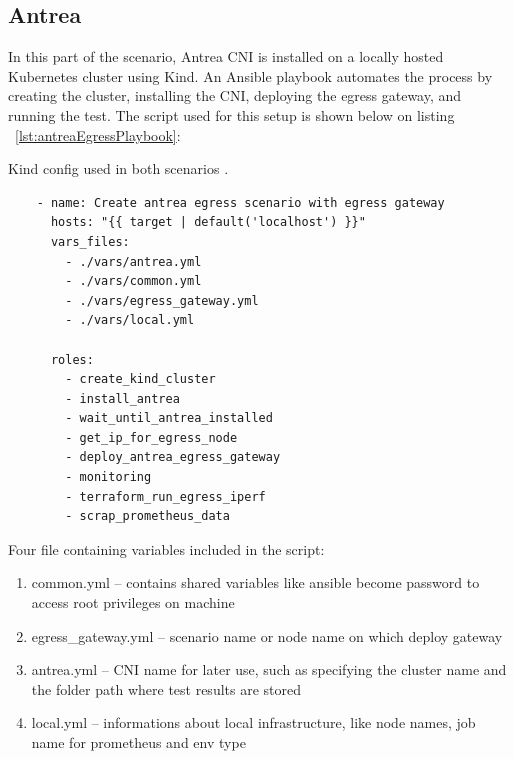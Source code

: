 \subsection{Antrea}
\label{sec:antreaEgress}

In this part of the scenario, Antrea CNI is installed on a locally hosted Kubernetes cluster using Kind. An Ansible playbook automates the process by creating the cluster, installing the CNI, deploying the egress gateway, and running the test. The script used for this setup is shown below on listing ~\ref{lst:antreaEgressPlaybook}:

\begin{listing}[H]
  \centering
  \caption{Kind config used in both scenarios \cite{KindConfig}.}
  \begin{verbatim}
    - name: Create antrea egress scenario with egress gateway
      hosts: "{{ target | default('localhost') }}"
      vars_files:
        - ./vars/antrea.yml
        - ./vars/common.yml
        - ./vars/egress_gateway.yml
        - ./vars/local.yml

      roles:
        - create_kind_cluster
        - install_antrea
        - wait_until_antrea_installed
        - get_ip_for_egress_node
        - deploy_antrea_egress_gateway
        - monitoring
        - terraform_run_egress_iperf
        - scrap_prometheus_data
  \end{verbatim}
  \label{lst:antreaEgressPlaybook}
\end{listing}

Four file containing variables included in the script:
\begin{enumerate}
  \item common.yml -- contains shared variables like ansible become password to access root privileges on machine
  \item egress\_gateway.yml -- scenario name or node name on which deploy gateway
  \item antrea.yml -- CNI name for later use, such as specifying the cluster name and the folder path where test results are stored
  \item local.yml -- informations about local infrastructure, like node names, job name for prometheus and env type
\end{enumerate}

